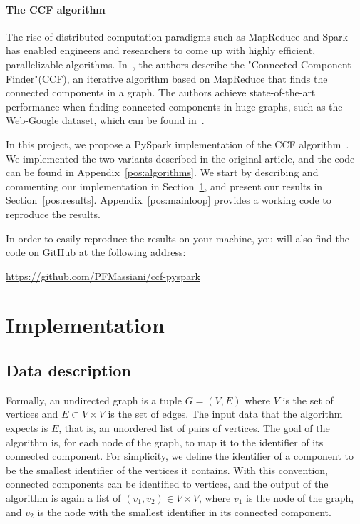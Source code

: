 \documentclass[a4paper,12pt]{article}
\begin{document}
\paragraph{The CCF algorithm} The rise of distributed computation paradigms such as MapReduce and Spark has enabled engineers and researchers to come up with highly efficient, parallelizable algorithms. In~\cite{kardes2014ccf}, the authors describe the "Connected Component Finder"(CCF), an iterative algorithm based on MapReduce that finds the connected components in a graph. The authors achieve state-of-the-art performance when finding connected components in huge graphs, such as the Web-Google dataset, which can be found in~\cite{snapnets}.\par
In this project, we propose a PySpark implementation of the CCF algorithm~\cite{kardes2014ccf}. We implemented the two variants described in the original article, and the code can be found in Appendix~\ref{pos:algorithms}. We start by describing and commenting our implementation in Section~\ref{pos:implementation}, and present our results in Section~\ref{pos:results}.
Appendix~\ref{pos:mainloop} provides a working code to reproduce the results.\par
In order to easily reproduce the results on your machine, you will also find the code on GitHub at the following address:
\begin{center}
	\url{https://github.com/PFMassiani/ccf-pyspark} 
\end{center}
\section{Implementation}
\label{pos:implementation}
\subsection{Data description}
Formally, an undirected graph is a tuple $G=(V,E)$ where $V$ is the set of vertices and $E\subset V\times V$ is the set of edges. The input data that the algorithm expects is $E$, that is, an unordered list of pairs of vertices. The goal of the algorithm is, for each node of the graph, to map it to the identifier of its connected component. For simplicity, we define the identifier of a component to be the smallest identifier of the vertices it contains. With this convention, connected components can be identified to vertices, and the output of the algorithm is again a list of $(v_1,v_2)\in V\times V$, where $v_1$ is the node of the graph, and $v_2$ is the node with the smallest identifier in its connected component.
\end{document}
